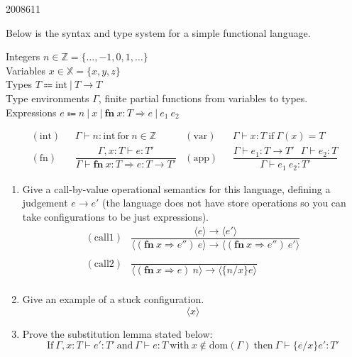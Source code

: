 \documentclass[10pt,\jkfside,a4paper]{article}
\begin{document}
\begin{examquestion}{2008}{6}{11}

Below is the syntax and type system for a simple functional language.

Integers $n \in \mathbb{Z} = \{\dots, -1, 0, 1, \dots\}$\\
Variables $x \in \mathbb{X} = \{x, y, z\}$\\
Types $T \Coloneqq \text{int} \ | \ T \to T$ \\
Type environments $\Gamma$, finite partial functions from variables to types.\\
Expressions $e \Coloneqq n \ | \ x \ | \ \textbf{fn} \ x:T \Rightarrow e \ |
\ e_1 \ e_2 $

\begin{align*}
(\text{int}) \ \ \ & \Gamma \vdash n: \text{int} \ \text{for} \ n \in
\mathbb{Z}
&
(\text{var}) \ \ \ & \Gamma \vdash x: T \ \text{if} \ \Gamma(x) = T \\
(\text{fn}) \ \ \ & \dfrac{\Gamma, x:T \vdash e: T'}{\Gamma \vdash \textbf{fn} \
x: T \Rightarrow e : T \to T'}
&
(\text{app}) \ \ \ &
\dfrac{\Gamma \vdash e_1: T \to T' \ \ \ \Gamma \vdash e_2: T}{\Gamma \vdash
 e_1 \ e_2: T'}
\end{align*}

\begin{enumerate}[label=(\alph*)]

\item Give a call-by-value operational semantics for this language, defining
a judgement $e \to e'$ (the language does not have store operations so you
can take configurations to be just expressions).
\begin{align*}
(\text{call1}) &
\dfrac{\langle e \rangle \to \langle e' \rangle }
{\langle (\textbf{fn} \ x \Rightarrow e'') \ e \rangle
\to
\langle (\textbf{fn} \ x \Rightarrow e'') \ e' \rangle
}
\\\\
(\text{call2}) &
\dfrac{}{
\langle (\textbf{fn} \ x \Rightarrow e) \ n \rangle
\to
\langle \{n/x\}e \rangle
} \\
\end{align*}

\item Give an example of a stuck configuration.
\[
\langle x \rangle
\]

\item Prove the substitution lemma stated below:
\[
\text{If} \ \Gamma , x: T \vdash e': T' \ \text{and} \ \Gamma \vdash e : T
\ \text{with} \ x \notin \text{dom}(\Gamma) \ \text{then} \ \Gamma \vdash
\{e/x\}e': T'
\]


\end{enumerate}
\end{examquestion}
\end{document}
